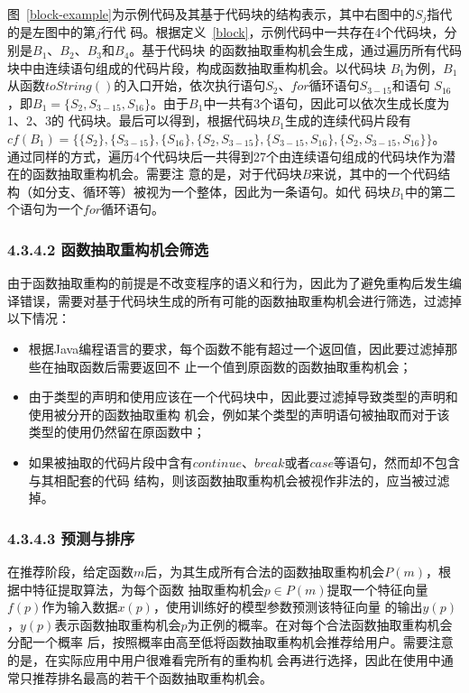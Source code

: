 图~\ref{block-example}为示例代码及其基于代码块的结构表示，其中右图中的$S_j$指代的是左图中的第$j$行代
码。根据定义~\ref{block}，示例代码中一共存在4个代码块，分别是$B_1$、$B_2$、$B_3$和$B_4$。基于代码块
的函数抽取重构机会生成，通过遍历所有代码块中由连续语句组成的代码片段，构成函数抽取重构机会。以代码块
$B_1$为例，$B_1$从函数$toString()$的入口开始，依次执行语句$S_2$、$for$循环语句$S_{3-15}$和语句
$S_{16}$，即$B_1=\{S_2,S_{3-15},S_{16}\}$。由于$B_1$中一共有3个语句，因此可以依次生成长度为1、2、3的
代码块。最后可以得到，根据代码块$B_1$生成的连续代码片段有
$cf(B_1)=\{\{S_2\},\{S_{3-15}\},\{S_{16}\},\{S_2,S_{3-15}\},\{S_{3-15},S_{16}\},\{S_2,S_{3-15},S_{16}\}\}$。
通过同样的方式，遍历4个代码块后一共得到27个由连续语句组成的代码块作为潜在的函数抽取重构机会。需要注
意的是，对于代码块$B$来说，其中的一个代码结构（如分支、循环等）被视为一个整体，因此为一条语句。如代
码块$B_1$中的第二个语句为一个$for$循环语句。

\subsubsection{4.3.4.2 函数抽取重构机会筛选}
由于函数抽取重构的前提是不改变程序的语义和行为，因此为了避免重构后发生编译错误，需要对基于代码块生成的所有可能的函数抽取重构机会进行筛选，过滤掉以下情况：
\begin{itemize}
  \item 根据Java编程语言的要求，每个函数不能有超过一个返回值，因此要过滤掉那些在抽取函数后需要返回不
  止一个值到原函数的函数抽取重构机会；
  \item 由于类型的声明和使用应该在一个代码块中，因此要过滤掉导致类型的声明和使用被分开的函数抽取重构
  机会，例如某个类型的声明语句被抽取而对于该类型的使用仍然留在原函数中；
  \item 如果被抽取的代码片段中含有$continue$、$break$或者$case$等语句，然而却不包含与其相配套的代码
  结构，则该函数抽取重构机会被视作非法的，应当被过滤掉。
\end{itemize}

\subsubsection{4.3.4.3 预测与排序}
在推荐阶段，给定函数$m$后，为其生成所有合法的函数抽取重构机会$P(m)$，根据中特征提取算法，为每个函数
抽取重构机会$p\in P(m)$提取一个特征向量$f(p)$作为输入数据$x(p)$，使用训练好的模型参数预测该特征向量
的输出$y(p)$，$y(p)$表示函数抽取重构机会$p$为正例的概率。在对每个合法函数抽取重构机会分配一个概率
后，按照概率由高至低将函数抽取重构机会推荐给用户。需要注意的是，在实际应用中用户很难看完所有的重构机
会再进行选择，因此在使用中通常只推荐排名最高的若干个函数抽取重构机会。


